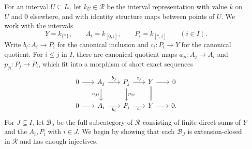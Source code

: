 \documentclass[a4paper,reqno,10pt]{amsart}
\numberwithin{equation}{section}
\theoremstyle{definition}
\newcommand{\B}{\mathcal B}
\newcommand{\Rcat}{\mathcal R}
\begin{document}
For an interval $U\subseteq I_*$, let $k_U\in\Rcat$ be the interval
representation with value $k$ on $U$ and $0$ elsewhere, and with identity
structure maps between points of $U$. We work with the intervals
\[
  Y=k_{\{*\}},\qquad A_i=k_{[0,i]},\qquad P_i=k_{[*,i]}
       \qquad(i\in I).
\]
Write $b_i:A_i\to P_i$ for the canonical inclusion and $c_i:P_i\to Y$ for the
canonical quotient. For $i\leq j$ in $I$, there are canonical quotient maps
$a_{ji}:A_j\to A_i$ and $p_{ji}:P_j\to P_i$, which fit into a morphism of short
exact sequences
\begin{equation}\label{eq:rows}
\begin{tikzcd}[column sep=1.8em]
0\ar[r]&A_j\ar[r,"b_j"]\ar[d,"a_{ji}"']&P_j\ar[r,"c_j"]\ar[d,"p_{ji}"]&
Y\ar[r]\ar[d,equal]&0\\
0\ar[r]&A_i\ar[r,"b_i"']&P_i\ar[r,"c_i"']&Y\ar[r]&0 .
\end{tikzcd}
\end{equation}
For $J\subseteq I$, let $\B_J$ be the full subcategory of $\Rcat$ consisting of
finite direct sums of $Y$ and the $A_i,P_i$ with $i\in J$. We begin by showing
that each $\B_J$ is extension-closed in $\Rcat$ and has enough injectives.
\end{document}
